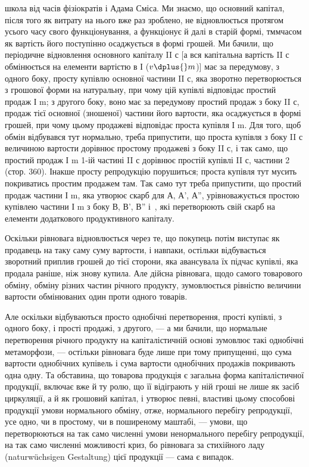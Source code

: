 \parcont{}  %
школа від часів фізіократів і Адама Сміса. Ми знаємо, що основний
капітал, після того як витрату на нього вже раз зроблено, не відновлюється
протягом усього часу свого функціонування, а функціонує й
далі в старій формі, тммчасом як вартість його поступінно осаджується
в формі грошей. Ми бачили, що періодичне відновлення основного капіталу
II с [а вся капітальна вартість II с обмінюється на елементи вартістю
в І ($v \dplus{} m$)] має за передумову, з одного боку, просту купівлю
основної частини II с, яка зворотно перетворюється з грошової форми
на натуральну, при чому цій купівлі відповідає простий продаж І m;
з другого боку, воно має за передумову простий продаж з боку
II с, продаж тієї основної (зношеної) частини його вартости, яка осаджується
в формі грошей, при чому цьому продажеві відповідає проста
купівля І m. Для того, щоб обмін відбувався тут нормально, треба припустити,
що проста купівля з боку II с величиною вартости дорівнює
простому продажеві з боку II с, і так само, що простий продаж І m
1-ій частині II с дорівнює простій купівлі II с, частини 2 (стор. 360).
Інакше просту репродукцію порушиться; проста купівля тут мусить
покриватись простим продажем там. Так само тут треба припустити,
що простий продаж частини І m, яка утворює скарб для А,
А', А'', урівноважується простою купівлею частини І m з боку В, В', В''
і~, які перетворюють свій скарб на елементи додаткового продуктивного
капіталу.

Оскільки рівновага відновлюється через те, що покупець потім виступає
як продавець на таку саму суму вартости, і навпаки, остільки відбувається
зворотний приплив грошей до тієї сторони, яка авансувала їх
підчас купівлі, яка продала раніше, ніж знову купила. Але дійсна рівновага,
щодо самого товарового обміну, обміну різних частин річного продукту,
зумовлюється рівністю величини вартости обмінюваних один проти
одного товарів.

Але оскільки відбуваються просто однобічні перетворення, прості
купівлі, з одного боку, і прості продажі, з другого, — а ми бачили, що
нормальне перетворення річного продукту на капіталістичній основі зумовлює
такі однобічні метаморфози, — остільки рівновага буде лише при
тому припущенні, що сума вартости однобічних купівель і сума вартости
однобічних продажів покривають одна одну. Та обставина, що товарова
продукція є загальна форма капіталістичної продукції, включає вже й ту
ролю, що її відіграють у ній гроші не лише як засіб циркуляції, а й
як грошовий капітал, і утворює певні, властиві цьому способові продукції
умови нормального обміну, отже, нормального перебігу репродукції,
усе одно, чи в простому, чи в поширеному маштабі, — умови,
що перетворюються на так само численні умови ненормального перебігу
репродукції, на так само численні можливості криз, бо рівновага за стихійного
ладу (naturwüchsigen Gestaltung) цієї продукції — сама є випадок.

